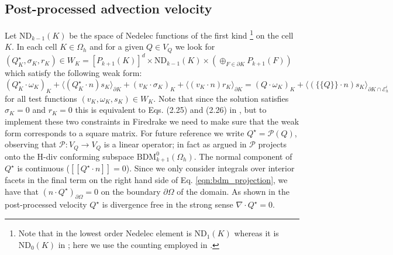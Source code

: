 \documentclass[11pt]{article}
\newcommand{\jump}[1]{[\![ #1]\!]}
\newcommand{\avg}[1]{\{\!\{#1\}\!\}}
\begin{document}
\subsection{Post-processed advection velocity}
Let $\text{ND}_{k-1}(K)$ be the space of Nedelec functions of the first kind \cite[Section 3.5.1]{Logg2012}\footnote{Note that in \cite{Logg2012} the lowest order Nedelec element is $\text{ND}_{1}(K)$ whereas it is $\text{ND}_{0}(K)$ in \cite{Guzman2016}; here we use the counting employed in \cite{Guzman2016}.} on the cell $K$. In each cell $K\in\Omega_h$ and for a given $Q\in V_Q$ we look for $(Q^\star_K,\sigma_K,r_K) \in W_K = [P_{k+1}(K)]^d\times \text{ND}_{k-1}(K)\times \left(\oplus_{F\in\partial K} P_{k+1}(F)\right)$ which satisfy the following weak form:
\begin{equation}
    (Q^\star_K\cdot  \omega_K)_K + \langle (Q_K^\star\cdot n)s_K\rangle_{\partial K} + (v_K\cdot \sigma_K)_K + \langle (v_K\cdot n)r_K\rangle_{\partial K} = (Q\cdot\omega_K)_K + \langle (\avg{Q}\cdot n)s_K\rangle_{\partial K\cap \mathcal{E}_h^i}\label{eqn:bdm_projection}
\end{equation}
for all test functions $(v_K,\omega_K,s_K)\in W_K$. Note that since the solution satisfies $\sigma_K=0$ and $r_K=0$ this is equivalent to Eqs. (2.25) and (2.26) in \cite{Guzman2016}, but to implement these two constraints in Firedrake we need to make sure that the weak form corresponds to a square matrix. For future reference we write $Q^\star = \mathcal{P}(Q)$, observing that $\mathcal{P}:V_Q \rightarrow V_Q$ is a linear operator; in fact as argued in \cite{Guzman2016} $\mathcal{P}$ projects onto the H-div conforming subspace $\text{BDM}^0_{k+1}(\Omega_h)$. The normal component of $Q^\star$ is continuous ($\jump{Q^\star\cdot n} = 0$). Since we only consider integrals over interior facets in the final term on the right hand side of Eq. \eqref{eqn:bdm_projection}, we have that $(n\cdot Q^\star)_{\partial \Omega} = 0$ on the boundary $\partial\Omega$ of the domain. As shown in \cite{Guzman2016} the post-processed velocity $Q^\star$ is divergence free in the strong sense $\nabla \cdot Q^\star=0$.
\end{document}
